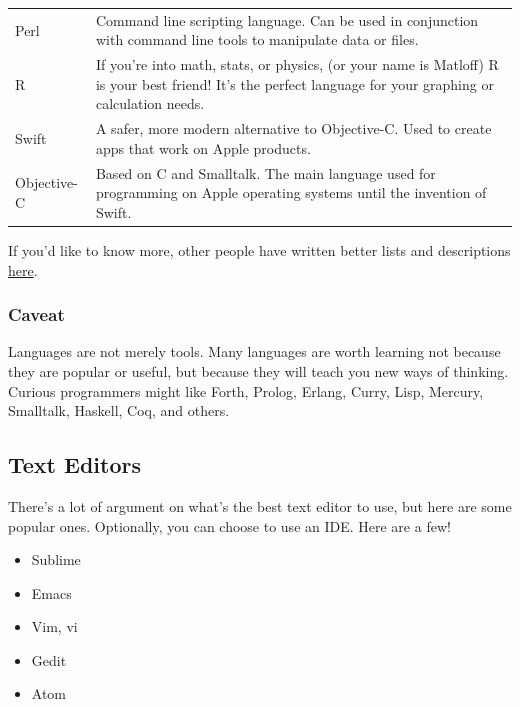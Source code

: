 \documentclass{article}
\begin{document}
\begin{center}
\begin{tabular} {l p{10cm}}
  Perl
  & Command line scripting language. Can be used in conjunction with command
    line tools to manipulate data or files.\\
  \addlinespace[0.5em]
  R
  & If you're into math, stats, or physics, (or your name is Matloff) R is your
    best friend! It's the perfect language for your graphing or calculation
    needs.\\
  \addlinespace[0.5em]
  Swift
  & A safer, more modern alternative to Objective-C. Used to create apps that
    work on Apple products.\\
  \addlinespace[0.5em]
  Objective-C
  & Based on C and Smalltalk. The main language used for programming on Apple
    operating systems until the invention of Swift.\\
  \bottomrule
\end{tabular}
\end{center}
If you'd like to know more, other people have written better lists and
descriptions
\href{https://www.quora.com/What-are-the-pros-and-cons-and-uses-of-the-major-programming-languages}{here}.

\subsubsection{Caveat}
Languages are not merely tools. Many languages are worth learning not because
they are popular or useful, but because they will teach you new ways of
thinking. Curious programmers might like Forth, Prolog, Erlang, Curry, Lisp,
Mercury, Smalltalk, Haskell, Coq, and others.

\subsection{Text Editors}
There's a lot of argument on what's the best text editor to use, but here are
some popular ones. Optionally, you can choose to use an IDE. Here are a few!
\begin{itemize}
\item Sublime
\item Emacs
\item Vim, vi
\item Gedit
\item Atom
\end{itemize}
\end{document}
